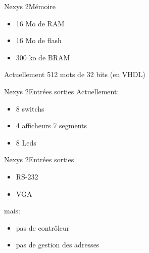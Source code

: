 \documentclass{beamer}
\begin{document}

  \begin{frame}{Nexys 2}{Mémoire}
    \begin{itemize}
      \item 16 Mo de RAM
      \item 16 Mo de flash
      \item 300 ko de BRAM
    \end{itemize}
    Actuellement 512 mots de 32 bits (en VHDL)
  \end{frame}

  \begin{frame}{Nexys 2}{Entrées sorties}
    Actuellement:
    \begin{itemize}
      \item 8 switchs
      \item 4 afficheurs 7 segments
      \item 8 Leds
    \end{itemize}
  \end{frame}

  \begin{frame}{Nexys 2}{Entrées sorties}
    \begin{itemize}
      \item RS-232
      \item VGA
    \end{itemize}
    mais:
    \begin{itemize}
      \item pas de contrôleur
      \item pas de gestion des adresses
    \end{itemize}
  \end{frame}
\end{document}
